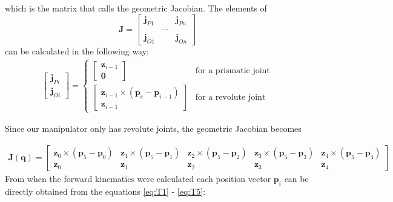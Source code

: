 which is the matrix that \cite{Siciliano} calls the geometric Jacobian. The elements of 
$$
\bm{J} = 
\begin{bmatrix}
    \bm{j}_{P1} & & \bm{j}_{Pn}\\
    &...&\\
    \bm{j}_{O1} & & \bm{j}_{On}
\end{bmatrix}
$$
can be calculated in the following way:
\begin{align*}
    \begin{bmatrix}
        \bm{j}_{Pi}\\\bm{j}_{Oi}
    \end{bmatrix}
    =
    \begin{cases}
        \begin{bmatrix} \bm{z}_{i-1}\\ \bm{0} \end{bmatrix} & \text{for a prismatic joint}\\
        \begin{bmatrix} \bm{z}_{i-1} \times (\bm{p}_e-\bm{p}_{i-1}) \\ \bm{z}_{i-1} \end{bmatrix} & \text{for a revolute joint}
    \end{cases}
\end{align*}

Since our manipulator only has revolute joints, the geometric Jacobian becomes

\begin{align*}
    \bm{J}(\bm{q}) = 
    \begin{bmatrix}
        \bm{z}_0 \times (\bm{p}_5-\bm{p}_0) & 
        \bm{z}_1 \times (\bm{p}_5-\bm{p}_1) & 
        \bm{z}_2 \times (\bm{p}_5-\bm{p}_2) & 
        \bm{z}_3 \times (\bm{p}_5-\bm{p}_3) & 
        \bm{z}_4 \times (\bm{p}_5-\bm{p}_4) \\
        \bm{z}_0 &
        \bm{z}_1 &
        \bm{z}_2 &
        \bm{z}_3 &
        \bm{z}_4
    \end{bmatrix}
\end{align*}
From when the forward kinematics were calculated each position vector $\bm{p}_i$ can be directly obtained from the equations \eqref{eq:T1} - \eqref{eq:T5}:



